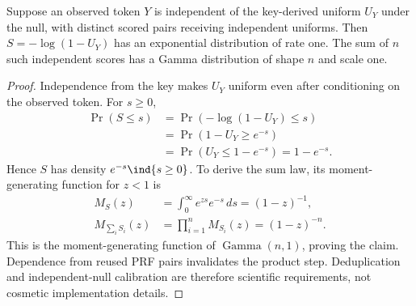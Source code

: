 \begin{proposition}
Suppose an observed token $Y$ is independent of the key-derived uniform $U_Y$ under the null, with distinct scored pairs receiving independent uniforms. Then $S=-\log(1-U_Y)$ has an exponential distribution of rate one. The sum of $n$ such independent scores has a Gamma distribution of shape $n$ and scale one.
\end{proposition}
\begin{proof}
Independence from the key makes $U_Y$ uniform even after conditioning on the observed token. For $s\geq0$,
\begin{align}
\Pr(S\leq s)
&=\Pr(-\log(1-U_Y)\leq s)\\
&=\Pr(1-U_Y\geq e^{-s})\\
&=\Pr(U_Y\leq1-e^{-s})=1-e^{-s}.
\end{align}
Hence $S$ has density $e^{-s}\ind\{s\geq0\}$. To derive the sum law, its moment-generating function for $z<1$ is
\begin{align}
M_S(z)&=\int_0^\infty e^{zs}e^{-s}\,ds=(1-z)^{-1},\\
M_{\sum_iS_i}(z)&=\prod_{i=1}^nM_{S_i}(z)=(1-z)^{-n}.
\end{align}
This is the moment-generating function of $\operatorname{Gamma}(n,1)$, proving the claim. Dependence from reused PRF pairs invalidates the product step. Deduplication and independent-null calibration are therefore scientific requirements, not cosmetic implementation details.
\end{proof}

